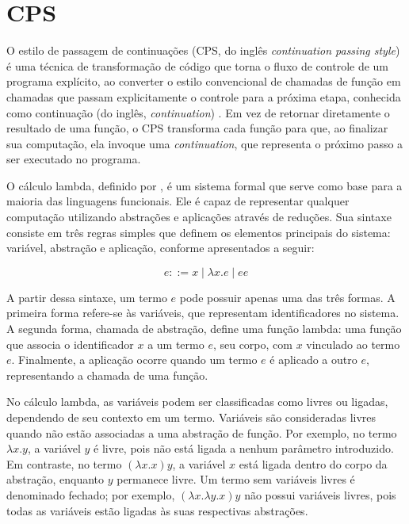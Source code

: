 \section{CPS}\label{sec:cps}

O estilo de passagem de continuações (CPS, do inglês \textit{continuation passing style}) é uma técnica de transformação de código que torna o fluxo de controle de um programa explícito, ao converter o estilo convencional de chamadas de função em chamadas que passam explicitamente o controle para a próxima etapa, conhecida como continuação (do inglês, \textit{continuation}) \cite{appel1992compiling}.
Em vez de retornar diretamente o resultado de uma função, o CPS transforma cada função para que, ao finalizar sua computação, ela invoque uma \textit{continuation}, que representa o próximo passo a ser executado no programa.

O cálculo lambda, definido por , é um sistema formal que serve como base para a maioria das linguagens funcionais.
Ele é capaz de representar qualquer computação utilizando abstrações e aplicações através de reduções.
Sua sintaxe consiste em três regras simples que definem os elementos principais do sistema: variável, abstração e aplicação, conforme apresentados a seguir:

\begin{equation} \label{eq:lambda-calculus}
  e ::= x \mid \lambda x. e \mid e e
\end{equation}

A partir dessa sintaxe, um termo $e$ pode possuir apenas uma das três formas.
A primeira forma refere-se às variáveis, que representam identificadores no sistema.
A segunda forma, chamada de abstração, define uma função lambda: uma função que associa o identificador $x$ a um termo $e$, seu corpo, com $x$ vinculado ao termo $e$.
Finalmente, a aplicação ocorre quando um termo $e$ é aplicado a outro $e$, representando a chamada de uma função.

No cálculo lambda, as variáveis podem ser classificadas como livres ou ligadas, dependendo de seu contexto em um termo.
Variáveis são consideradas livres quando não estão associadas a uma abstração de função.
Por exemplo, no termo $\lambda x. y$, a variável $y$ é livre, pois não está ligada a nenhum parâmetro introduzido.
Em contraste, no termo $(\lambda x. x) y$, a variável $x$ está ligada dentro do corpo da abstração, enquanto $y$ permanece livre.
Um termo sem variáveis livres é denominado fechado; por exemplo, $(\lambda x. \lambda y. x) y$ não possui variáveis livres, pois todas as variáveis estão ligadas às suas respectivas abstrações.

